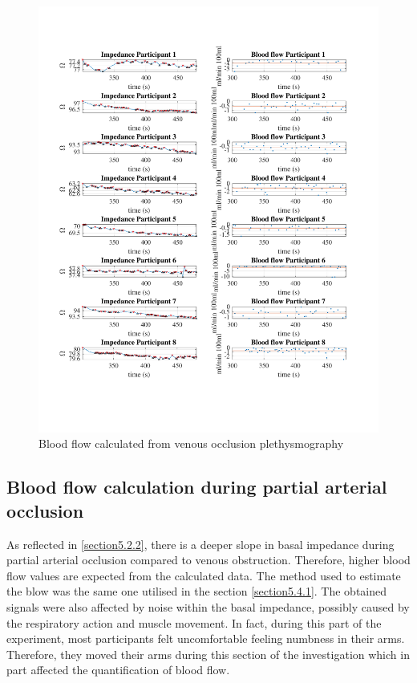 \begin{figure}
	\includegraphics[width=\textwidth,height=\textheight,keepaspectratio,trim={0.5cm 0.5cm 2cm 2cm},clip]{figure12}    
	\caption{Blood flow calculated from venous occlusion plethysmography}
	\label{fig:blood_flow:venous_occlusion}
\end{figure}

\subsection{Blood flow calculation during partial arterial occlusion}
\label{section5.4.2}
As reflected in \ref{section5.2.2}, there is a deeper slope in basal impedance during partial arterial occlusion compared to venous obstruction. Therefore, higher blood flow values are expected from the calculated data. The method used to estimate the blow was the same one utilised in the section \ref{section5.4.1}. The obtained signals were also affected by noise within the basal impedance, possibly caused by the respiratory action and muscle movement. In fact, during this part of the experiment, most participants felt uncomfortable feeling numbness in their arms. Therefore, they moved their arms during this section of the investigation which in part affected the quantification of blood flow.

